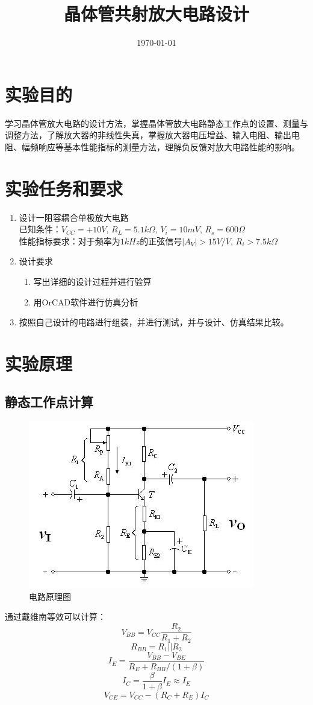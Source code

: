 \documentclass{../source/Experiment}
\title{晶体管共射放大电路设计}
\date{\today}
\begin{document}
    \makecover
    \makeheader

    \section{实验目的}
    学习晶体管放大电路的设计方法，掌握晶体管放大电路静态工作点的设置、测量与调整方法，了解放大器的非线性失真，掌握放大器电压增益、输入电阻、输出电阻、幅频响应等基本性能指标的测量方法，理解负反馈对放大电路性能的影响。
    \section{实验任务和要求}
        \begin{enumerate}
            \item 设计一阻容耦合单极放大电路\\ 已知条件：$V_{CC} = +10V,\, R_L = 5.1k \Omega ,\,  V_i = 10mV,\, R_s = 600 \Omega$\\ 性能指标要求：对于频率为$1kHz$的正弦信号$|A_V|>15V/V, \, R_i>7.5k\Omega$
            \item 设计要求
                \begin{enumerate}
                    \item 写出详细的设计过程并进行验算
                    \item 用OrCAD软件进行仿真分析
                \end{enumerate}
            \item 按照自己设计的电路进行组装，并进行测试，并与设计、仿真结果比较。
        \end{enumerate}
    \section{实验原理}
        \subsection{静态工作点计算}
        \newpage
            \begin{figure}[h]
                \centering
                \includegraphics{pic/共射放大器.jpg}
                \caption{电路原理图}
            \end{figure}
        通过戴维南等效可以计算：
        $$V_{BB}=V_{CC}\frac{R_2}{R_1+R_2}$$
        $$R_{BB}=R_1||R_2$$
        $$I_E=\frac{V_{BB}-V_{BE}}{R_E+R_{BB}/(1+\beta)}$$
        $$I_C=\frac{\beta}{1+\beta}I_E \approx I_E$$
        $$V_{CE}=V_{CC}-(R_C+R_E)I_C$$
\end{document}
